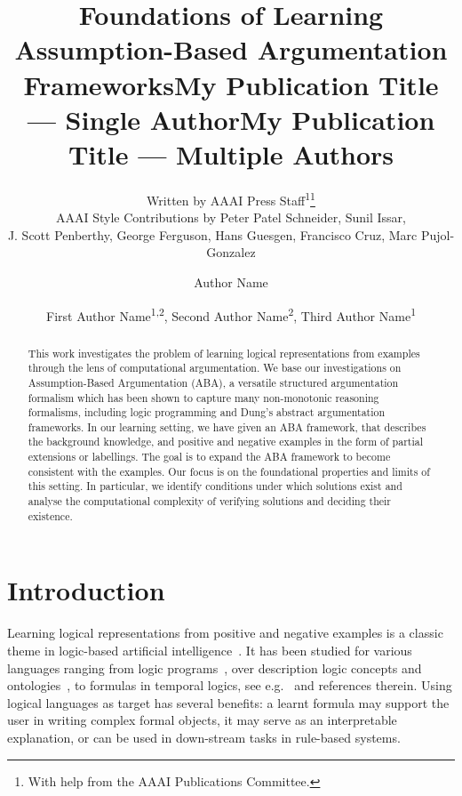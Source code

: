 \documentclass[letterpaper]{article} %
\title{Foundations of Learning Assumption-Based Argumentation Frameworks}
\author{
    Written by AAAI Press Staff\textsuperscript{\rm 1}\thanks{With help from the AAAI Publications Committee.}\\
    AAAI Style Contributions by Peter Patel Schneider,
    Sunil Issar,\\
    J. Scott Penberthy,
    George Ferguson,
    Hans Guesgen,
    Francisco Cruz\equalcontrib\corresponding,
    Marc Pujol-Gonzalez\equalcontrib\corresponding
}
\title{My Publication Title --- Single Author}
\author {
    Author Name
}
\title{My Publication Title --- Multiple Authors}
\author {
    First Author Name\textsuperscript{\rm 1,\rm 2}\equalcontrib,
    Second Author Name\textsuperscript{\rm 2}\equalcontrib,
    Third Author Name\textsuperscript{\rm 1}\corresponding
}
\begin{document}
\maketitle

\begin{abstract}
This work investigates the problem of learning logical representations from examples through the lens of computational argumentation. We base our investigations on Assumption-Based Argumentation (ABA), a versatile structured argumentation formalism which has been shown to capture many non-monotonic reasoning formalisms, including logic programming and Dung’s abstract argumentation frameworks. In our learning setting, we have given an ABA framework, that describes the background knowledge, and positive and negative examples in the form of partial extensions or labellings. The goal is to expand the ABA framework to become consistent with the examples. Our focus is on the foundational properties and limits of this setting. In particular, we identify conditions under which solutions exist and analyse the computational complexity of verifying solutions and deciding their existence.
%
\end{abstract}

\section{Introduction}
Learning logical representations from positive and negative examples is a classic theme in logic-based artificial intelligence~\cite{Angluin87,Mitchell82}. It has been studied for various languages ranging from logic programs~\cite{MUGGLETON1994629,CropperD22}, over description logic concepts and ontologies~\cite{DBLP:journals/ki/Ozaki20,DBLP:conf/ijcai/FunkJLPW19,DBLP:journals/ml/LehmannH10}, to formulas in temporal logics, see e.g.~\cite{DBLP:conf/birthday/Neider025} and references therein. Using logical languages as target has several benefits: a learnt formula may support the user in writing complex formal objects, it may serve as an interpretable explanation, or can be used in down-stream tasks in rule-based systems. 
\end{document}
